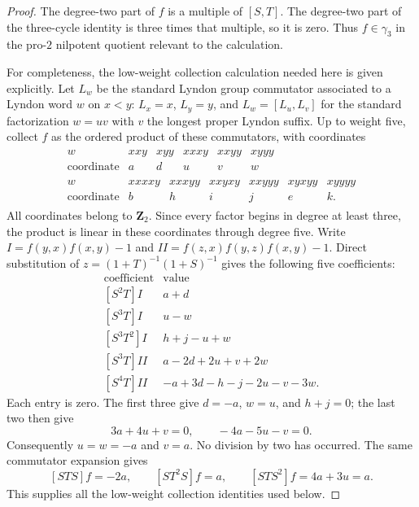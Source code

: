 \begin{proof}
The degree-two part of $f$ is a multiple of $[S,T]$.  The degree-two
part of the three-cycle identity is three times that multiple, so it is
zero.  Thus $f\in\gamma_3$ in the pro-$2$ nilpotent quotient relevant
to the calculation.

For completeness, the low-weight collection calculation needed here is
given explicitly.  Let $L_w$ be the standard Lyndon group commutator
associated to a Lyndon word $w$ on $x<y$: $L_x=x$, $L_y=y$, and
$L_w=[L_u,L_v]$ for the standard factorization $w=uv$ with $v$ the
longest proper Lyndon suffix.  Up to weight five, collect $f$ as the
ordered product of these commutators, with coordinates
\[
\begin{gathered}
\begin{array}{c|rrrrr}
 w&xxy&xyy&xxxy&xxyy&xyyy\\
 \hline
 \text{coordinate}&a&d&u&v&w
\end{array}
\\[5pt]
\begin{array}{c|rrrrrr}
 w&xxxxy&xxxyy&xxyxy&xxyyy&xyxyy&xyyyy\\
 \hline
 \text{coordinate}&b&h&i&j&e&k.
\end{array}
\end{gathered}
\]
All coordinates belong to $\mathbf Z_2$.  Since every factor begins in
degree at least three, the product is linear in these coordinates
through degree five.  Write $I=f(y,x)f(x,y)-1$ and
$II=f(z,x)f(y,z)f(x,y)-1$.  Direct substitution of
$z=(1+T)^{-1}(1+S)^{-1}$ gives the following five coefficients:
\[
\begin{array}{c|l}
\text{coefficient}&\text{value}\\ \hline
{[S^2T]I}&a+d\\
{[S^3T]I}&u-w\\
{[S^3T^2]I}&h+j-u+w\\
{[S^3T]II}&a-2d+2u+v+2w\\
{[S^4T]II}&-a+3d-h-j-2u-v-3w.
\end{array}
\]
Each entry is zero.  The first three give $d=-a$, $w=u$, and
$h+j=0$; the last two then give
\[
 3a+4u+v=0,\qquad -4a-5u-v=0.
\]
Consequently $u=w=-a$ and $v=a$.  No division by two has occurred.
The same commutator expansion gives
\begin{equation}\label{eq:cubic-three-small-coefficients}
 [STS]f=-2a,\qquad
 [ST^2S]f=a,\qquad
 [STS^2]f=4a+3u=a.
\end{equation}
This supplies all the low-weight collection identities used below.


\end{proof}
